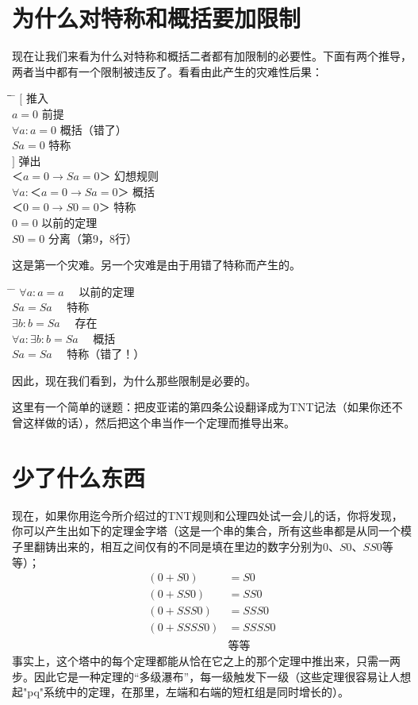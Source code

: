 \section{为什么对特称和概括要加限制}

现在让我们来看为什么对特称和概括二者都有加限制的必要性。下面有两个推导，两者当中都有一个限制被违反了。看看由此产生的灾难性后果：

\begin{tabbing*}
\indent\indent \= \quad \= \tabindent{-2em} \= \+\kill
$[$ \>                     \>推入\+\\
  $a=0$                    \>前提\\
  $\forall a:a=0$          \>概括（错了）\\
  $Sa=0$                   \>特称\-\\
$]$ \>                     \>弹出\\
$＜a=0→Sa=0＞$ \>           \>幻想规则\\
$\forall a:＜a=0→Sa=0＞$ \> \>概括\\
$＜0=0→S0=0＞$ \>           \>特称\\
$0=0$ \>                   \>以前的定理\\
$S0=0$ \>                  \>分离（第9，8行）
\end{tabbing*}

这是第一个灾难。另一个灾难是由于用错了特称而产生的。

\begin{tabbing*}
\indent\indent \= \tabindent{-2em} \= \+\kill
$\forall a:a=a$             \>　以前的定理\\
$Sa=Sa$                     \>　特称\\
$\exists b:b=Sa$            \>　存在\\
$\forall a:\exists b:b=Sa$  \>　概括\\
$Sa=Sa$ \>　特称（错了！）
\end{tabbing*}
因此，现在我们看到，为什么那些限制是必要的。

这里有一个简单的谜题：把皮亚诺的第四条公设翻译成为TNT记法（如果你还不曾这样做的话），然后把这个串当作一个定理而推导出来。

\section{少了什么东西}

现在，如果你用迄今所介绍过的TNT规则和公理四处试一会儿的话，你将发现，你可以产生出如下的定理金字塔（这是一个串的集合，所有这些串都是从同一个模子里翻铸出来的，相互之间仅有的不同是填在里边的数字分别为$0$、$S0$、$SS0$等等）；
\begin{align*}
(0+S0)    & = S0 \\
(0+SS0)   & = SS0 \\
(0+SSS0)  & = SSS0 \\
(0+SSSS0) & = SSSS0 \\
          & \text{等等}
\end{align*}
事实上，这个塔中的每个定理都能从恰在它之上的那个定理中推出来，只需一两步。因此它是一种定理的“多级瀑布”，每一级触发下一级（这些定理很容易让人想起"pq"系统中的定理，在那里，左端和右端的短杠组是同时增长的）。

